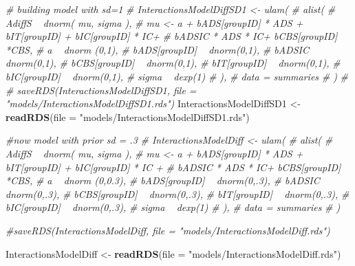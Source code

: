 \documentclass[10pt,dvipsnames,enabledeprecatedfontcommands]{scrartcl}
\newenvironment{Shaded}{\begin{snugshade}}{\end{snugshade}}
\newcommand{\CommentTok}[1]{\textcolor[rgb]{0.56,0.35,0.01}{\textit{#1}}}
\newcommand{\DataTypeTok}[1]{\textcolor[rgb]{0.13,0.29,0.53}{#1}}
\newcommand{\KeywordTok}[1]{\textcolor[rgb]{0.13,0.29,0.53}{\textbf{#1}}}
\newcommand{\NormalTok}[1]{#1}
\newcommand{\StringTok}[1]{\textcolor[rgb]{0.31,0.60,0.02}{#1}}
\begin{document}
\begin{Shaded}
\begin{Highlighting}[]
\CommentTok{# building model with sd=1}
\CommentTok{# InteractionsModelDiffSD1 <- ulam(}
\CommentTok{#   alist(}
\CommentTok{#     AdiffS ~ dnorm( mu, sigma ),}
\CommentTok{#     mu <- a + bADS[groupID] * ADS +  bIT[groupID] + bIC[groupID] * IC+}
\CommentTok{#     bADSIC * ADS * IC+ bCBS[groupID] *CBS,}
\CommentTok{#     a ~ dnorm (0,1),}
\CommentTok{#     bADS[groupID] ~ dnorm(0,1),}
\CommentTok{#     bADSIC ~ dnorm(0,1),}
\CommentTok{#     bCBS[groupID] ~ dnorm(0,1),}
\CommentTok{#     bIT[groupID] ~ dnorm(0,1),}
\CommentTok{#     bIC[groupID] ~ dnorm(0,1),}
\CommentTok{#     sigma  ~ dexp(1)}
\CommentTok{#   ), }
\CommentTok{#   data = summaries}
\CommentTok{# )}
\CommentTok{# }
\CommentTok{# saveRDS(InteractionsModelDiffSD1, file = "models/InteractionsModelDiffSD1.rds")}
\NormalTok{InteractionsModelDiffSD1 <-}\StringTok{ }\KeywordTok{readRDS}\NormalTok{(}\DataTypeTok{file =} \StringTok{"models/InteractionsModelDiffSD1.rds"}\NormalTok{)}


\CommentTok{#now model with prior sd = .3}
\CommentTok{# InteractionsModelDiff <- ulam(}
\CommentTok{#   alist(}
\CommentTok{#     AdiffS ~ dnorm( mu, sigma ),}
\CommentTok{#     mu <- a + bADS[groupID] * ADS +  bIT[groupID] + bIC[groupID] * IC +}
\CommentTok{#     bADSIC * ADS * IC+ bCBS[groupID] *CBS,}
\CommentTok{#     a ~ dnorm (0,0.3),}
\CommentTok{#     bADS[groupID] ~ dnorm(0,.3),}
\CommentTok{#     bADSIC ~ dnorm(0,.3),}
\CommentTok{#     bCBS[groupID] ~ dnorm(0,.3),}
\CommentTok{#     bIT[groupID] ~ dnorm(0,.3),}
\CommentTok{#     bIC[groupID] ~ dnorm(0,.3),}
\CommentTok{#     sigma  ~ dexp(1)}
\CommentTok{#   ), }
\CommentTok{#   data = summaries}
\CommentTok{# )}

\CommentTok{#saveRDS(InteractionsModelDiff, file = "models/InteractionsModelDiff.rds")}

\NormalTok{InteractionsModelDiff <-}\StringTok{ }\KeywordTok{readRDS}\NormalTok{(}\DataTypeTok{file =} \StringTok{"models/InteractionsModelDiff.rds"}\NormalTok{)}


\end{Highlighting}
\end{Shaded}
\end{document}
